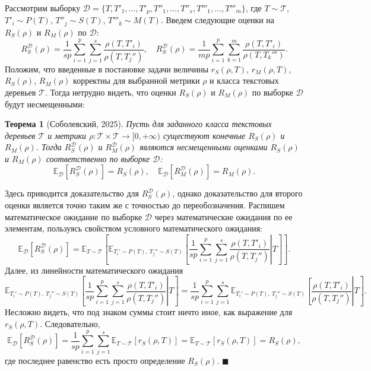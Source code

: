 \documentclass[12pt]{article}
\newcommand{\E}{\mathbb{E}}
\newtheorem{Th}{Теорема}
\newenvironment{Proof} %
    {\par\noindent{\bf Доказательство.}} %
    {\hfill$\scriptstyle\blacksquare$} %
\begin{document}
Рассмотрим выборку $\mathcal{D} = \{T, T'_1, \dots, T'_p, T''_1, \dots, T''_s, T'''_1, \dots, T'''_m\}$, где $T\sim \mathcal{T}$, $T'_i\sim P(T)$, $T''_j\sim S(T)$, $T'''_k\sim M(T)$. Введем следующие оценки на $R_S(\rho)$ и $R_M(\rho)$ по $\mathcal{D}$:
$$
R^\mathcal{D}_S(\rho) = \frac{1}{sp}\sum\limits_{i=1}^p\sum\limits_{j=1}^s\frac{\rho(T, T'_i)}{\rho(T, T_j'')},
\quad R^\mathcal{D}_S(\rho) = \frac{1}{mp}\sum\limits_{i=1}^p\sum\limits_{k=1}^m\frac{\rho(T, T'_i)}{\rho(T, T_k''')}.
$$
Положим, что введенные в постановке задачи величины $r_S(\rho, T)$, $r_M(\rho, T)$, $R_S(\rho)$, $R_M(\rho)$ корректны для выбранной метрики $\rho$ и класса текстовых деревьев $\mathcal{T}$. Тогда нетрудно видеть, что оценки $R_S(\rho)$ и $R_M(\rho)$ по выборке $\mathcal{D}$ будут несмещенными:
\begin{Th}[Соболевский, 2025]
    Пусть для заданного класса текстовых деревьев $\mathcal{T}$ и метрики $\rho: \mathcal{T}\times\mathcal{T}\longrightarrow [0, +\infty)$ существуют конечные $R_S(\rho)$ и $R_M(\rho)$. Тогда $R_S^\mathcal{D}(\rho)$ и $R_M^\mathcal{D}(\rho)$ являются несмещенными оценками $R_S(\rho)$ и $R_M(\rho)$ соответственно по выборке $\mathcal{D}$:
    $$
    \E_\mathcal{D}[R_S^\mathcal{D}(\rho)] = R_S(\rho), \quad \E_\mathcal{D}[R_M^\mathcal{D}(\rho)] = R_M(\rho).
    $$
\end{Th}
\begin{Proof}
    Здесь приводится доказательство для $R^\mathcal{D}_S(\rho)$, однако доказательство для второго оценки является точно таким же с точностью до переобозначения. Распишем математическое ожидание по выборке $\mathcal{D}$ через математические ожидания по ее элементам, пользуясь свойством условного математического ожидания:
    $$
        \E_\mathcal{D}[R_S^\mathcal{D}(\rho)] = 
        \E_{T\sim \mathcal{T}}\left[\E_{T_i'\sim P(T), \ T_j''\sim S(T)}\left[\left.\frac{1}{sp}\sum\limits_{i=1}^p\sum\limits_{j=1}^s\frac{\rho(T, T'_i)}{\rho(T, T_j'')} \right| T \right]\right].
    $$
    Далее, из линейности математического ожидания
    $$
        \E_{T_i'\sim P(T), \ T_j''\sim S(T)}\left[\left.\frac{1}{sp}\sum\limits_{i=1}^p\sum\limits_{j=1}^s\frac{\rho(T, T'_i)}{\rho(T, T_j'')} \right| T \right] = \left.\frac{1}{sp}\sum\limits_{i=1}^p\sum\limits_{j=1}^s\E_{T_i'\sim P(T), \ T_j''\sim S(T)}\left[\frac{\rho(T, T'_i)}{\rho(T, T_j'')} \right| T \right].
    $$
    Несложно видеть, что под знаком суммы стоит ничто иное, как выражение для $r_S(\rho, T)$. Следовательно,
    $$
        \E_\mathcal{D}[R_S^\mathcal{D}(\rho)] = \frac{1}{sp}\sum\limits_{i=1}^p\sum\limits_{j=1}^s \E_{T\sim \mathcal{T}}[r_S(\rho, T)] = \E_{T\sim \mathcal{T}}[r_S(\rho, T)]  = R_S(\rho),
    $$
    где последнее равенство есть просто определение $R_S(\rho)$.
\end{Proof}
\end{document}
